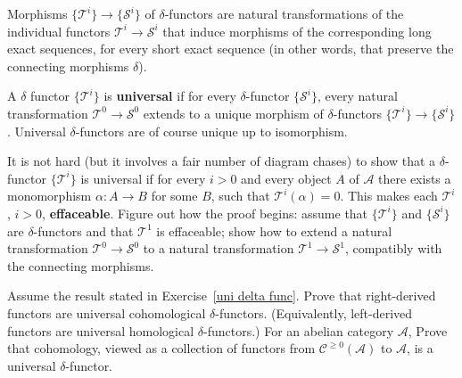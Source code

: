 \begin{exercise}\label{uni delta func}
Morphisms $\{\mathscr{T}^i\}\to\{\mathscr{S}^i\}$ of $\delta$-functors are natural transformations of the individual functors $\mathscr{T}^i\to\mathscr{S}^i$ that induce morphisms of the corresponding
long exact sequences, for every short exact sequence (in other words, that preserve the connecting morphisms $\delta$).\par
A $\delta$ functor $\{\mathscr{T}^i\}$ is \textbf{universal} if for every $\delta$-functor $\{\mathscr{S}^i\}$, every natural transformation $\mathscr{T}^0\to\mathscr{S}^0$ extends to a unique morphism of $\delta$-functors $\{\mathscr{T}^i\}\to\{\mathscr{S}^i\}$. Universal $\delta$-functors are of course unique up to isomorphism.\par
It is not hard (but it involves a fair number of diagram chases) to show that a $\delta$-functor $\{\mathscr{T}^i\}$ is universal if for every $i>0$ and every object $A$ of $\mathcal{A}$ there exists a
monomorphism $\alpha:A\to B$ for some $B$, such that $\mathscr{T}^i(\alpha)=0$. This makes each $\mathscr{T}^i$, $i>0$, \textbf{effaceable}. Figure out how the proof begins: assume that $\{\mathscr{T}^i\}$ and $\{\mathscr{S}^i\}$ are $\delta$-functors and that $\mathscr{T}^1$ is effaceable; show how to extend a natural transformation $\mathscr{T}^0\to\mathscr{S}^0$ to a natural transformation $\mathscr{T}^1\to\mathscr{S}^1$, compatibly with the connecting morphisms.
\end{exercise}
\begin{exercise}\label{uni delta func eg}
Assume the result stated in Exercise~\ref{uni delta func}. Prove that right-derived functors are universal cohomological $\delta$-functors. (Equivalently, left-derived functors are universal homological $\delta$-functors.) For an abelian category $\mathcal{A}$, Prove that cohomology, viewed as a collection of functors from $\mathcal{C}^{\geq0}(\mathcal{A})$ to $\mathcal{A}$, is a universal $\delta$-functor.\par
\end{exercise}
